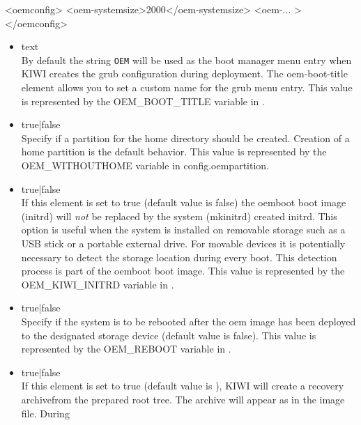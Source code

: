 \begin{itemize}
\begin{xml}
<oemconfig>
  <oem-systemsize>2000</oem-systemsize>
  <oem-... >
</oemconfig>
\end{xml}

	\begin{itemize}
    \item {}text\\
       By default the string \verb!OEM! will be used as the boot manager 
       menu entry when KIWI creates the grub configuration during
       deployment. The oem-boot-title element allows you to set a custom
       name for the grub menu entry. This value is represented by the
       OEM\_BOOT\_TITLE variable in .
	\item {}true|false\\
       Specify if a partition for the home directory should be created.
       Creation of a home partition is the default behavior. This value is 
       represented by the OEM\_WITHOUTHOME variable in config.oempartition.
	\item {}true|false\\
       If this element is set to true (default value is false) the oemboot 
       boot image (initrd) will \emph{not} be replaced by the system 
       (mkinitrd) created initrd. This option is useful when the system
       is installed on removable storage such as a USB stick or a portable
       external drive. For movable devices it is potentially necessary to 
       detect the storage location during every boot. This detection
       process is part of the oemboot boot image. This value is represented
       by the OEM\_KIWI\_INITRD variable in .
	\item {}true|false\\
       Specify if the system is to be rebooted after the oem image has been
       deployed to the designated storage device (default value is false). 
       This value is represented by the OEM\_REBOOT variable in 
       .
	\item {}true|false\\
      If this element is set to true (default value is ), KIWI will
      create a recovery archivefrom the prepared root tree. The archive will 
      appear as  in the image file. During 

\end{itemize}
\end{itemize}
